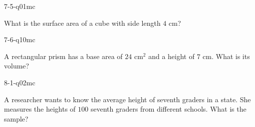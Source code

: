 \begin{practiceQuestion}{7-5-q01}{mc}
\begin{questionText}
What is the surface area of a cube with side length $4$ cm?
\end{questionText}
\end{practiceQuestion}

\begin{practiceQuestion}{7-6-q10}{mc}
\begin{questionText}
A rectangular prism has a base area of $24$ cm$^2$ and a height of $7$ cm. What is its volume?
\end{questionText}
\end{practiceQuestion}

\begin{practiceQuestion}{8-1-q02}{mc}
\begin{questionText}
A researcher wants to know the average height of seventh graders in a state. She measures the heights of $100$ seventh graders from different schools. What is the sample?
\end{questionText}
\end{practiceQuestion}

